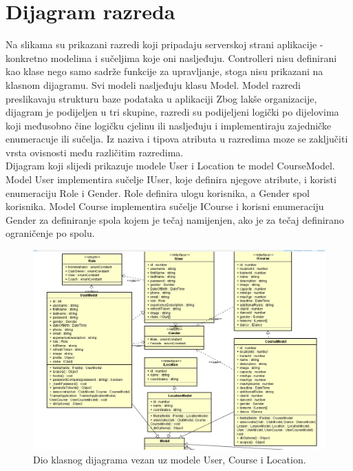 			\eject
			
			
		\section{Dijagram razreda}
		
			\noindent Na slikama su prikazani razredi koji pripadaju serverskoj strani aplikacije - konkretno modelima i 
			sučeljima koje oni nasljeđuju. Controlleri nisu definirani kao klase nego samo sadrže funkcije za upravljanje, stoga nisu 
			prikazani na klasnom dijagramu.
			Svi modeli nasljeđuju klasu Model. Model razredi preslikavaju strukturu baze podataka u aplikaciji
			Zbog lakše organizacije, dijagram je podijeljen u tri skupine, razredi su podijeljeni logički po dijelovima koji međusobno čine 
			logičku cjelinu ili nasljeđuju i implementiraju zajedničke enumeracuje ili sučelja.
			Iz naziva i tipova atributa u razredima moze se zaključiti vrsta ovisnosti među različitim razredima. \\

			\noindent Dijagram koji slijedi prikazuje modele User i Location te 
			model CourseModel.
			Model User implementira sučelje IUser, koje definira njegove atribute, i koristi enumeraciju Role i Gender. Role definira ulogu korisnika, a 
			Gender spol korisnika. Model Course implementira sučelje ICourse i korisni enumeraciju Gender za definiranje spola kojem je tečaj namijenjen, ako je za tečaj definirano ograničenje po spolu.
			\\
			\begin{figure}[H]
				\includegraphics[scale=1.0]{slike/class1.png}
				\centering
				\caption{Dio klasnog dijagrama vezan uz modele User, Course i Location.}
				\label{fig:class1}
			\end{figure}		
			
